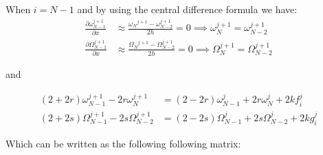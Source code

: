 When $i=N-1$ and by using the central difference formula we have:
\begin{subequations}
\begin{align}
    \frac{\partial \omega_{N-1}^{j+1}}{\partial x} &\approx \frac{{\omega_{N}}^{j+1} - \omega_{N-2}^{j+1}}{2h} = 0
    \implies  \omega_{N}^{j+1} = \omega_{N-2}^{j+1}  \\
    \frac{\partial \Omega_{N-1}^{j+1}}{\partial x} &\approx \frac{{\Omega_{N}}^{j+1} - \Omega_{N-2}^{j+1}}{2h} = 0
    \implies  \Omega_{N}^{j+1} = \Omega_{N-2}^{j+1} 
\end{align}
\end{subequations}

and

\begin{subequations} \label{eq:rearranged_approx_sys}
\begin{align}
    (2+2r) \omega_{N-1}^{j+1} - 2r \omega_{N}^{j+1} &=
        (2-2r) \omega_{N-1}^{j} + 2r \omega_{N}^{j} + 2k f_{i}^{j}
        \\
    (2+2s) \Omega_{N-1}^{j+1} - 2s \Omega_{N-2}^{j+1} &=
        (2-2s) \Omega_{N-1}^{j} + 2s \Omega_{N-2}^{j} + 2k g_{i}^{j}
\end{align}
\end{subequations}

Which can be written as the following following matrix:

